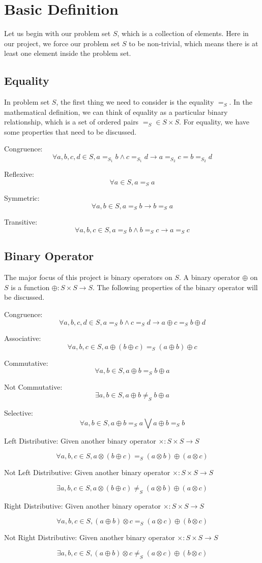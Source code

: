 \documentclass[a4paper,12pt,twoside,openright]{report}
\newcommand{\e}[2]{
\begin{equation}
  \label{#1} 
  #2
\end{equation}
}
\begin{document}
\section{Basic Definition}
 Let us begin with our problem set $S$, which is a collection of elements. Here in our project, we force our problem set $S$ to be non-trivial, which means there is at least one element inside the problem set.

\subsection{Equality}
In problem set $S$, the first thing we need to consider is the equality $=_S$. 
In the mathematical definition, we can think of equality as a particular binary relationship, which is a set of ordered pairs $=_S \in S \times S$. For equality, we have some properties that need to be discussed. 

Congruence: \e{def:eq:congruence}{\forall a,b,c,d \in S, a =_{S_1} b \wedge c =_{S_1} d \rightarrow a =_{S_2} c = b =_{S_2} d}
Reflexive: \e{def:eq:reflexive}{\forall a \in S, a =_S a}
Symmetric: \e{def:eq:symmetric}{\forall a,b \in S, a =_S b \rightarrow b =_S a}
Transitive: \e{def:eq:transitive}{\forall a,b,c \in S, a =_S b \wedge b=_S c \rightarrow a =_S c}

\subsection{Binary Operator}
The major focus of this project is binary operators on $S$. A binary operator $\oplus$ on $S$ is a function $\oplus : S \times S \rightarrow S$. The following properties of the binary operator will be discussed. 

Congruence: \e{def:bop:congruence}{\forall a,b,c,d \in S, a =_S b \wedge c =_S d \rightarrow a \oplus c =_S b \oplus d}
Associative: \e{def:bop:associative}{\forall a,b,c \in S, a \oplus (b \oplus c) =_S (a \oplus b) \oplus c}
Commutative: \e{def:bop:commutative}{\forall a,b \in S, a \oplus b =_S b \oplus a}
Not Commutative: \e{def:bop:not_commutative}{\exists a,b \in S, a \oplus b \neq_S b \oplus a}
Selective: \e{def:bop:selective}{\forall a,b \in S, a \oplus b =_S a \bigvee a \oplus b =_S b}
Left Distributive: Given another binary operator $\times : S \times S \rightarrow S$
\e{def:bop:left_distributive}{\forall a,b,c \in S, a \otimes (b \oplus c) =_S (a \otimes b) \oplus (a \otimes c)}
Not Left Distributive: Given another binary operator $\times : S \times S \rightarrow S$
\e{def:bop:not_left_distributive}{\exists a,b,c \in S, a \otimes (b \oplus c) \neq_S (a \otimes b) \oplus (a \otimes c)}
Right Distributive: Given another binary operator $\times : S \times S \rightarrow S$
\e{def:bop:right_distributive}{\forall a,b,c \in S, (a \oplus b) \otimes c =_S (a \otimes c) \oplus (b \otimes c)}
Not Right Distributive: Given another binary operator $\times : S \times S \rightarrow S$
\e{def:bop:not_right_distributive}{\exists a,b,c \in S, (a \oplus b) \otimes c \neq_S (a \otimes c) \oplus (b \otimes c)}
\end{document}
